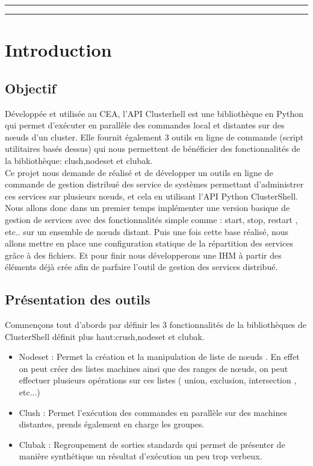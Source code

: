 \documentclass[a4paper,11pt]{article}
\begin{document}
\clearpage

\hrule\medskip

\begin{center}
  \tableofcontents
\end{center}

\medskip\hrule\bigskip\bigskip
\clearpage

\section{Introduction}
\label{sec:section1}
\subsection{Objectif}
\label{sub:1.1}
Développée et utilisée au CEA, l'API Clusterhell est une bibliothèque en Python qui permet d'exécuter en parallèle des commandes local et distantes sur des nœuds d'un cluster. Elle fournit également 3 outils en ligne de commande (script utilitaires basés dessus) qui nous permettent de bénéficier des fonctionnalités de la bibliothèque: clush,nodeset et clubak.
\\
Ce projet nous demande de réalisé et de développer un outils en ligne de commande de gestion distribué des service de systèmes permettant d'administrer ces services sur plusieurs nœuds, et cela en utilisant l'API Python ClusterShell.
\\
Nous allons donc dans un premier temps implémenter une version basique de gestion de services avec des fonctionnalités simple comme : start, stop, restart , etc.. sur un ensemble de nœuds distant. Puis une fois cette base réalisé, nous allons mettre en place une configuration statique de la répartition des services grâce à des fichiers. Et pour finir nous développerons une IHM à partir des éléments déjà crée afin de parfaire l'outil de gestion des services distribué. 

\subsection{Présentation des outils}
\label{sub:1.2}
Commençons tout d'abords par définir les 3 fonctionnalités de la bibliothèques de ClusterShell définit plus haut:crush,nodeset et clubak.
\\
\begin{itemize}
\item Nodeset : Permet la création et la manipulation de liste de nœuds . En effet on peut créer des listes machines ainsi que des ranges de nœuds, on peut effectuer plusieurs opérations sur ces listes ( union, exclusion, intersection , etc...)
\item Clush : Permet l'exécution des commandes en parallèle sur des machines distantes, prends également en charge les groupes.
\item Clubak : Regroupement de sorties standards qui permet de présenter de manière synthétique un résultat d'exécution un peu trop verbeux.
\end{itemize}
\end{document}

